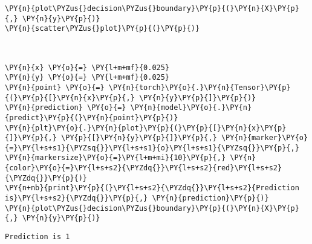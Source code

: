     \begin{tcolorbox}[breakable, size=fbox, boxrule=1pt, pad at break*=1mm,colback=cellbackground, colframe=cellborder]
\begin{Verbatim}[commandchars=\\\{\}]
\PY{n}{plot\PYZus{}decision\PYZus{}boundary}\PY{p}{(}\PY{n}{X}\PY{p}{,} \PY{n}{y}\PY{p}{)}
\PY{n}{scatter\PYZus{}plot}\PY{p}{(}\PY{p}{)}
\end{Verbatim}
\end{tcolorbox}

    \begin{center}
    \end{center}
    { \hspace*{\fill} \\}
    
    \begin{tcolorbox}[breakable, size=fbox, boxrule=1pt, pad at break*=1mm,colback=cellbackground, colframe=cellborder]
\begin{Verbatim}[commandchars=\\\{\}]
\PY{n}{x} \PY{o}{=} \PY{l+m+mf}{0.025}
\PY{n}{y} \PY{o}{=} \PY{l+m+mf}{0.025}
\PY{n}{point} \PY{o}{=} \PY{n}{torch}\PY{o}{.}\PY{n}{Tensor}\PY{p}{(}\PY{p}{[}\PY{n}{x}\PY{p}{,} \PY{n}{y}\PY{p}{]}\PY{p}{)}
\PY{n}{prediction} \PY{o}{=} \PY{n}{model}\PY{o}{.}\PY{n}{predict}\PY{p}{(}\PY{n}{point}\PY{p}{)}
\PY{n}{plt}\PY{o}{.}\PY{n}{plot}\PY{p}{(}\PY{p}{[}\PY{n}{x}\PY{p}{]}\PY{p}{,} \PY{p}{[}\PY{n}{y}\PY{p}{]}\PY{p}{,} \PY{n}{marker}\PY{o}{=}\PY{l+s+s1}{\PYZsq{}}\PY{l+s+s1}{o}\PY{l+s+s1}{\PYZsq{}}\PY{p}{,} \PY{n}{markersize}\PY{o}{=}\PY{l+m+mi}{10}\PY{p}{,} \PY{n}{color}\PY{o}{=}\PY{l+s+s2}{\PYZdq{}}\PY{l+s+s2}{red}\PY{l+s+s2}{\PYZdq{}}\PY{p}{)}
\PY{n+nb}{print}\PY{p}{(}\PY{l+s+s2}{\PYZdq{}}\PY{l+s+s2}{Prediction is}\PY{l+s+s2}{\PYZdq{}}\PY{p}{,} \PY{n}{prediction}\PY{p}{)}
\PY{n}{plot\PYZus{}decision\PYZus{}boundary}\PY{p}{(}\PY{n}{X}\PY{p}{,} \PY{n}{y}\PY{p}{)}
\end{Verbatim}
\end{tcolorbox}

    \begin{Verbatim}[commandchars=\\\{\}]
Prediction is 1
    \end{Verbatim}

    \begin{center}
    \end{center}
    { \hspace*{\fill} \\}